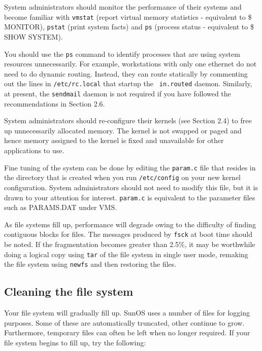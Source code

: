 System administrators should monitor the performance of their systems and
become familiar with {\tt vmstat} (report virtual memory statistics - 
equivalent to \$ MONITOR), 
{\tt pstat} (print system facts) and {\tt ps} (process status - equivalent to 
\$ SHOW SYSTEM). 

You should use the {\tt ps} command to identify processes that are using system
resources unnecessarily. For example, workstations with only one ethernet 
do not need to do dynamic routing. Instead, they can route statically by 
commenting out the lines in {\tt /etc/rc.local} that startup the {\tt
in.routed} daemon. Similarly, at present, the {\tt sendmail} daemon is not
required if you have followed the recommendations in Section 2.6.

System administrators should re-configure their kernels (see Section 2.4) 
to free up unnecessarily allocated memory. The kernel is not swapped or paged
and hence memory assigned to the kernel is fixed and unavailable for other
applications to use. 

Fine tuning of the system can be done by editing the {\tt param.c} file that resides
in the directory that is created when you run {\tt /etc/config} on your new kernel
configuration. System administrators should not need to modify this file, but
it is drawn to your attention for interest. {\tt param.c} is equivalent to the
parameter files such as PARAMS.DAT under VMS.

As file systems fill up, performance will degrade owing to the difficulty of
finding contiguous blocks for files. The messages produced by {\tt fsck} at 
boot time should be noted. If the fragmentation becomes greater than 2.5\%,
it may be worthwhile doing a logical copy using {\tt tar} of the file system
in single user mode, remaking the file system using {\tt newfs} and then
restoring the files.


\subsection{Cleaning the file system}

Your file system will gradually fill up. SunOS uses a number of files for
logging purposes. Some of these are automatically truncated, other continue to
grow. Furthermore, temporary files can often be left when no longer required.
If your file system begins to fill up, try the following:

